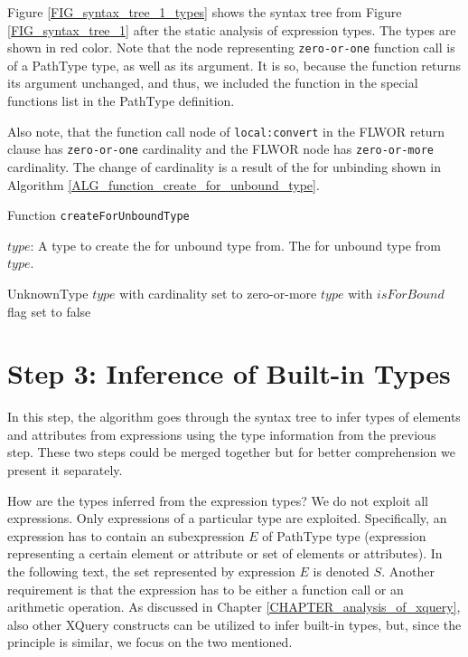 Figure \ref{FIG_syntax_tree_1_types} shows the syntax tree from Figure \ref{FIG_syntax_tree_1} after the static analysis of expression types. The types are shown in red color. Note that the node representing \texttt{zero-or-one} function call is of a PathType type, as well as its argument. It is so, because the function returns its argument unchanged, and thus, we included the function in the special functions list in the PathType definition.

Also note, that the function call node of \texttt{local:convert} in the FLWOR return clause has \texttt{zero-or-one} cardinality and the FLWOR node has \texttt{zero-or-more} cardinality. The change of cardinality is a result of the for unbinding shown in Algorithm \ref{ALG_function_create_for_unbound_type}.

\begin{algorithm}
\caption{Function \texttt{createForUnboundType}}
\label{ALG_function_create_for_unbound_type}
\begin{algorithmic}[1]
\REQUIRE $type$: A type to create the for unbound type from.
\ENSURE The for unbound type from $type$.

	\RETURN UnknownType
	\RETURN $type$ with cardinality set to zero-or-more
\ELSE
	\STATE {}
	\RETURN $type$ with $isForBound$ flag set to false
\ENDIF
\end{algorithmic}
\end{algorithm}

\section{Step 3: Inference of Built-in Types}
In this step, the algorithm goes through the syntax tree to infer types of elements and attributes from expressions using the type information from the previous step. These two steps could be merged together but for better comprehension we present it separately.

How are the types inferred from the expression types? We do not exploit all expressions. Only expressions of a particular type are exploited. Specifically, an expression has to contain an subexpression $E$ of PathType type (expression representing a certain element or attribute or set of elements or attributes). In the following text, the set represented by expression $E$ is denoted $S$. Another requirement is that the expression has to be either a function call or an arithmetic operation. As discussed in Chapter \ref{CHAPTER_analysis_of_xquery}, also other XQuery constructs can be utilized to infer built-in types, but, since the principle is similar, we focus on the two mentioned.

